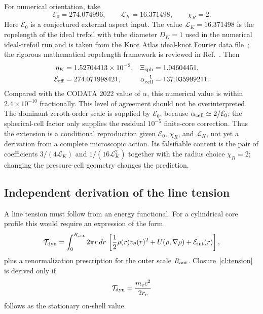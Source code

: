 \documentclass[aps,pra,preprint,longbibliography,nofootinbib]{revtex4-2}
\newcommand{\Et}{\mathcal{E}_0}                    %
\newcommand{\LK}{\mathcal{L}_K}                     %
\newcommand{\Xsph}{\Xi_{\mathrm{sph}}}             %
\newcommand{\chiR}{\chi_R}                         %
\begin{document}
For numerical orientation, take
\begin{equation}
  \Et=274.074996,
  \qquad
  \LK=16.371498,
  \qquad
  \chiR=2 .
  \label{eq:numerical_E0_LK}
\end{equation}
Here $\Et$ is a conjectured external aspect input.  The value
$\LK=16.371498$ is the ropelength of the ideal trefoil with tube diameter
$D_K=1$ used in the numerical ideal-trefoil run and is taken from the Knot
Atlas ideal-knot Fourier data file~\cite{KnotAtlasIdeal}; the rigorous
mathematical ropelength framework is reviewed in Ref.~\cite{Cantarella2002}.  Then
\begin{align}
  \eta_K &= 1.52704413\times10^{-2},
  &\Xsph &= 1.04604451,
  \label{eq:Xi_numbers}\\
  \mathcal E_{\rm eff} &= 274.071998421,
  &\alpha_{\rm cell}^{-1} &= 137.035999211 .
  \label{eq:alpha_cell_numbers}
\end{align}
Compared with the CODATA 2022 value of $\alpha$, this numerical value is
within $2.4\times10^{-10}$ fractionally.  This level of agreement should
not be overinterpreted.  The dominant zeroth-order scale is supplied by
$\Et$, because $\alpha_{\rm cell}\simeq2/\Et$; the spherical-cell factor
only supplies the residual $10^{-5}$ finite-core correction.  Thus the
extension is a conditional reproduction given $\Et$, $\chiR$, and
$\LK$, not yet a derivation from a complete microscopic action.  Its
falsifiable content is the pair of coefficients $3/(4\LK)$ and
$1/(16\LK^2)$ together with the radius choice $\chiR=2$; changing the
pressure-cell geometry changes the prediction.

\subsection{Independent derivation of the line tension}

A line tension must follow from an energy functional.  For a cylindrical
core profile this would require an expression of the form
\begin{equation}
  \mathcal{T}_{\rm dyn}
  = \int_0^{R_{\rm out}}2\pi r\,dr\,
    \left[\frac{1}{2}\rho(r)v_\theta(r)^2
    +U(\rho,\nabla\rho)+\mathcal{E}_{\rm int}(r)\right],
  \label{eq:needed_tension}
\end{equation}
plus a renormalization prescription for the outer scale $R_{\rm out}$.
Closure~\ref{cl:tension} is derived only if
\begin{equation}
  \mathcal{T}_{\rm dyn}=\frac{m_ec^2}{2r_c}
  \label{eq:tension_target}
\end{equation}
follows as the stationary on-shell value.
\end{document}

